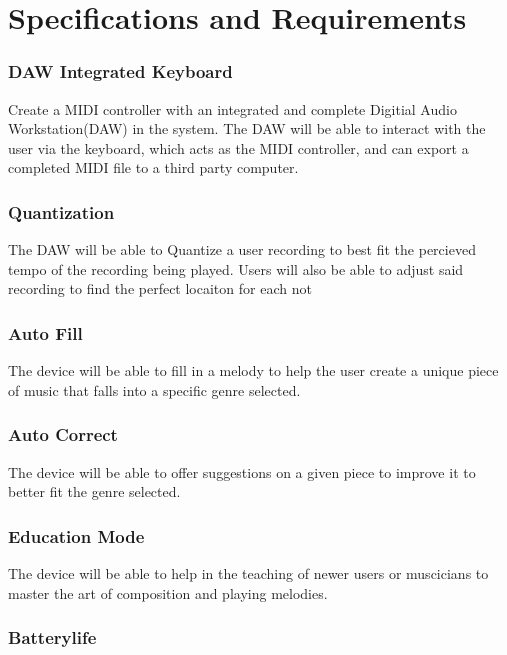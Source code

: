 \section{Specifications and Requirements}

\subsubsection{DAW Integrated Keyboard}

Create a MIDI controller with an integrated and complete Digitial Audio
Workstation(DAW) in the system. The DAW will be able to interact with the user
via the keyboard, which acts as the MIDI controller, and can export a completed
MIDI file to a third party computer.

\subsubsection{Quantization}

The DAW will be able to Quantize a user recording to best fit the percieved
tempo of the recording being played. Users will also be able to adjust said
recording to find the perfect locaiton for each not

\subsubsection{Auto Fill}

The device will be able to fill in a melody to help the user create a unique
piece of music that falls into a specific genre selected.

\subsubsection{Auto Correct}

The device will be able to offer suggestions on a given piece to improve it to
better fit the genre selected.

\subsubsection{Education Mode}

The device will be able to help in the teaching of newer users or muscicians to
master the art of composition and playing melodies.

\subsubsection{Batterylife}

